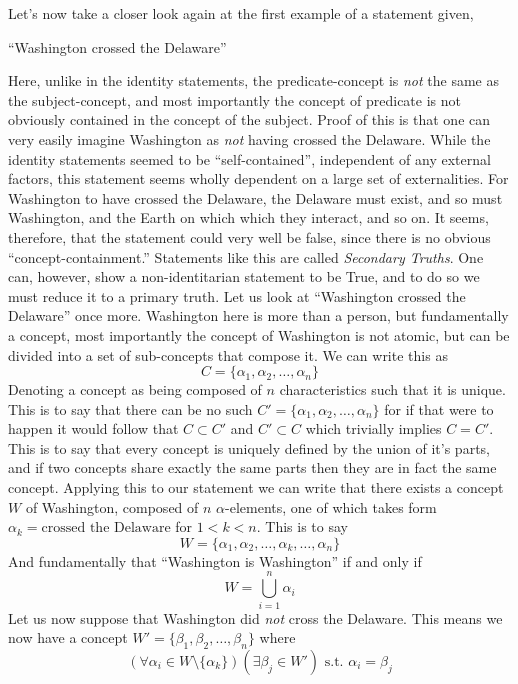 \documentclass{article}
\begin{document}
Let's now take a closer look again at the first example of a statement given,
    \begin{center}
        ``Washington crossed the Delaware''
    \end{center}
\noindent Here, unlike in the identity statements, the predicate-concept is \emph{not} the same as the subject-concept, and most importantly the concept of predicate is not obviously contained in the concept of the subject. Proof of this is that one can very easily imagine Washington as \emph{not} having crossed the Delaware. While the identity statements seemed to be ``self-contained'', independent of any external factors, this statement seems wholly dependent on a large set of externalities. For Washington to have crossed the Delaware, the Delaware must exist, and so must Washington, and the Earth on which which they interact, and so on. It seems, therefore, that the statement could very well be false, since there is no obvious ``concept-containment.'' Statements like this are called \emph{Secondary Truths}. One can, however, show a non-identitarian statement to be True, and to do so we must reduce it to a primary truth. Let us look at ``Washington crossed the Delaware'' once more. Washington here is more than a person, but fundamentally a concept, most importantly the concept of Washington is not atomic, but can be divided into a set of sub-concepts that compose it. We can write this as
    \[C = \{\alpha_1, \alpha_2, \ldots, \alpha_n\}\]
Denoting a concept as being composed of $n$ characteristics such that it is unique. This is to say that there can be no such \(C' = \{\alpha_1, \alpha_2, \ldots, \alpha_n\}\) for if that were to happen it would follow that \(C \subset C'\) and \(C' \subset C\) which trivially implies \(C = C'\). This is to say that every concept is uniquely defined by the union of it's parts, and if two concepts share exactly the same parts then they are in fact the same concept. Applying this to our statement we can write that there exists a concept \(W\) of Washington, composed of $n$ $\alpha$-elements, one of which takes form \(\alpha_k = \text{crossed the Delaware}\) for \(1 < k < n\). This is to say
    \[W = \{\alpha_1, \alpha_2, \ldots, \alpha_k, \ldots, \alpha_n\}\]
And fundamentally that ``Washington is Washington'' if and only if
    \[W = \bigcup_{i=1}^{n} \alpha_i\]
Let us now suppose that Washington did \emph{not} cross the Delaware. This means we now have a concept \(W' = \{\beta_1, \beta_2, \ldots, \beta_n\}\) where
    \[(\forall \alpha_i\in W\setminus \{\alpha_k\})(\exists \beta_j\in W') \text{ s.t. } \alpha_i=\beta_j\]
\end{document}
